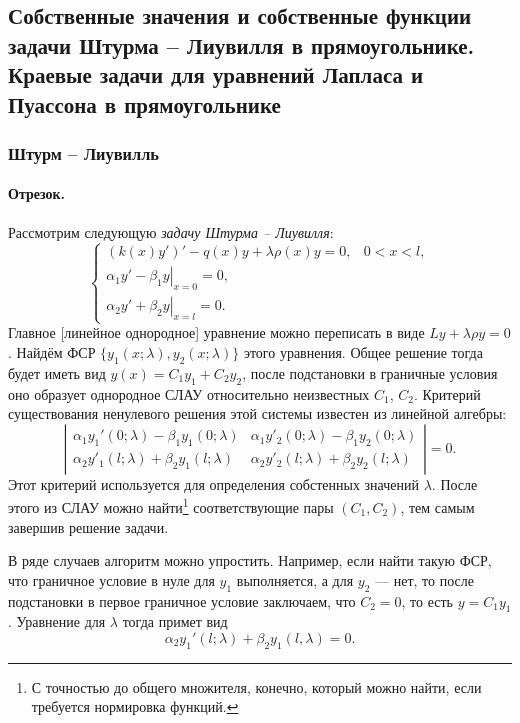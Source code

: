 \subsection{Собственные значения и собственные функции задачи Штурма -- Лиувилля
в прямоугольнике. Краевые задачи для уравнений Лапласа и Пуассона в
прямоугольнике}
\subsubsection{Штурм -- Лиувилль}
\paragraph{Отрезок.} Рассмотрим следующую \emph{задачу Штурма -- Лиувилля}: 
\[
  \begin{cases}
    \left( k(x) y' \right)' - q(x)y + \lambda\rho(x) y =0, &
    0<x<l,\\
    \left.\alpha_1 y' - \beta_1 y \right|_{x=0} = 0,\\
      \left. \alpha_2 y'+ \beta_2 y \right|_{x=l} = 0.
  \end{cases}
\]
Главное [линейное однородное] уравнение можно переписать в виде $ Ly +\lambda\rho y = 0 $.
Найдём ФСР $ \{y_1(x; \lambda), y_2(x; \lambda)\} $ этого уравнения. Общее
решение тогда будет иметь вид $ y(x) = C_1y_1 + C_2y_2 $, после подстановки в
граничные условия оно образует однородное СЛАУ относительно неизвестных $ C_1 $, $ C_2 $.
Критерий существования ненулевого решения этой системы известен из линейной
алгебры: 
\[
  \left| \begin{matrix}
    \alpha_1y_1'(0;\lambda) - \beta_1y_1(0; \lambda) & \alpha_1y'_2(0;\lambda) -
    \beta_1y_2(0;\lambda) \\
    \alpha_2y'_1(l; \lambda) + \beta_2y_1(l;\lambda) & \alpha_2y'_2(l;\lambda) +
    \beta_2y_2(l;\lambda)
  \end{matrix} \right| = 0.
\]
Этот критерий используется для определения собстенных значений $ \lambda $.
После этого из СЛАУ можно найти\footnote{С точностью до общего множителя, конечно,
который можно найти, если требуется нормировка функций.} соответствующие пары $ (C_1, C_2) $, тем самым
завершив решение задачи.

В ряде случаев алгоритм можно упростить. Например, если найти такую ФСР, что
граничное условие в нуле для $ y_1 $ выполняется, а для $ y_2 $ --- нет, то
после подстановки в первое граничное условие заключаем, что $ C_2 = 0 $, то есть
$ y = C_1y_1 $. Уравнение для $ \lambda $ тогда примет вид  
\[
    \alpha_2 y_1'(l; \lambda) + \beta_2 y_1(l,\lambda) = 0.
\]


